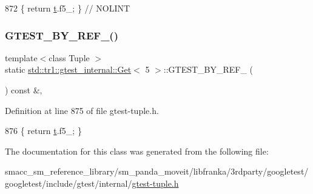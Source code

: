 \begin{DoxyCode}
872                   \{ \textcolor{keywordflow}{return} \hyperlink{namespacebattery__monitor__node_a7a63d20d1ea461e280f4eb5b47f925cd}{t}.f5\_; \}  \textcolor{comment}{// NOLINT}
\end{DoxyCode}
\mbox{\label{classstd_1_1tr1_1_1gtest__internal_1_1Get_3_015_01_4_ae10fe16450db82d69b9a4d0b149ca75d}} 
\subsubsection{\texorpdfstring{G\+T\+E\+S\+T\+\_\+\+B\+Y\+\_\+\+R\+E\+F\+\_\+()}{GTEST\_BY\_REF\_()}}
{\footnotesize\ttfamily template$<$class Tuple $>$ \\
static \hyperlink{classstd_1_1tr1_1_1gtest__internal_1_1Get}{std\+::tr1\+::gtest\+\_\+internal\+::\+Get}$<$ 5 $>$\+::G\+T\+E\+S\+T\+\_\+\+B\+Y\+\_\+\+R\+E\+F\+\_\+ (\begin{DoxyParamCaption}\item[{\hyperlink{gtest-tuple_8h_a1b7f133d8aa02e0b7afed7b66781eeb7}{G\+T\+E\+S\+T\+\_\+\+T\+U\+P\+L\+E\+\_\+\+E\+L\+E\+M\+E\+N\+T\+\_\+}(5, Tuple)}]{ }\end{DoxyParamCaption}) const \&\hspace{0.3cm}{\ttfamily [inline]}, {\ttfamily [static]}}



Definition at line 875 of file gtest-\/tuple.\+h.


\begin{DoxyCode}
876                              \{ \textcolor{keywordflow}{return} \hyperlink{namespacebattery__monitor__node_a7a63d20d1ea461e280f4eb5b47f925cd}{t}.f5\_; \}
\end{DoxyCode}


The documentation for this class was generated from the following file\+:\begin{DoxyCompactItemize}
\item 
smacc\+\_\+sm\+\_\+reference\+\_\+library/sm\+\_\+panda\+\_\+moveit/libfranka/3rdparty/googletest/googletest/include/gtest/internal/\hyperlink{gtest-tuple_8h}{gtest-\/tuple.\+h}\end{DoxyCompactItemize}
